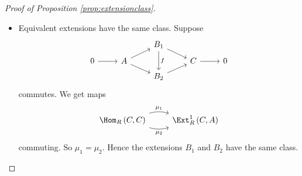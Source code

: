 \begin{proof}[Proof of Proposition \ref{prop:extensionclass}]
\begin{itemize}
\item Equivalent extensions have the same class. Suppose
$$
\begin{tikzcd}[row sep=tiny]
& & B_1 \arrow{dr} \arrow{dd}{f} & & \\
0 \arrow{r} & A \arrow{ur} \arrow{dr} & & C \arrow{r} & 0 \\
& & B_2 \arrow{ur} & &
\end{tikzcd}
$$
commutes. We get maps
$$
\begin{tikzcd}[row sep=tiny]
\Hom_R\br{C, C} \arrow[bend left=15]{r}{\mu_1} \arrow[bend right=15]{r}[swap]{\mu_2} & \Ext_R^1\br{C, A}
\end{tikzcd}
$$
commuting. So $ \mu_1 = \mu_2 $. Hence the extensions $ B_1 $ and $ B_2 $ have the same class.
\end{itemize}

\pagebreak


\end{proof}
